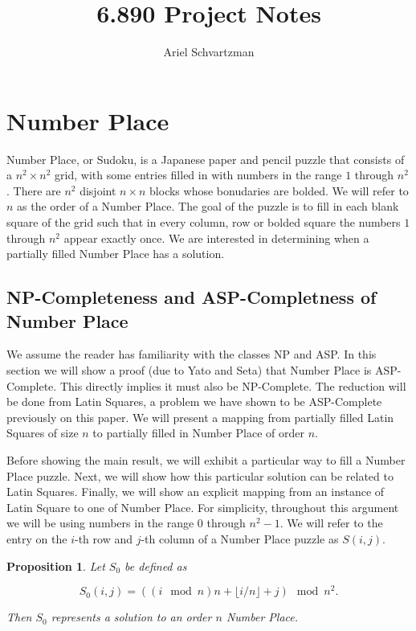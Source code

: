 \documentclass[11pt]{article}
\title{6.890 Project Notes}
\author{Ariel Schvartzman}
\newtheorem{proposition}[theorem]{Proposition}
\begin{document}
\maketitle

\section{Number Place} 

Number Place, or Sudoku, is a Japanese paper and pencil puzzle that consists of a $n^2 \times n^2$ grid, with some entries filled in with numbers in the range $1$ through $n^2$. There are $n^2$ disjoint $n \times n$ blocks whose bonudaries are bolded. We will refer to $n$ as the order of a Number Place. The goal of the puzzle is to fill in each blank square of the grid such that in every column, row or bolded square the numbers $1$ through $n^2$ appear exactly once. We are interested in determining when a partially filled Number Place has a solution. 
 
\subsection{NP-Completeness and ASP-Completness of Number Place}

We assume the reader has familiarity with the classes NP and ASP. In this section we will show a proof (due to Yato and Seta) that Number Place is ASP-Complete. This directly implies it must also be NP-Complete. The reduction will be done from Latin Squares, a problem we have shown to be ASP-Complete previously on this paper. We will present a mapping from partially filled Latin Squares of size $n$ to partially filled in Number Place of order $n$.  

Before showing the main result, we will exhibit a particular way to fill a Number Place puzzle. Next, we will show how this particular solution can be related to Latin Squares. Finally, we will show an explicit mapping from an instance of Latin Square to one of Number Place. For simplicity, throughout this argument we will be using numbers in the range $0$ through $n^2 - 1$. We will refer to the entry on the $i$-th row and $j$-th column of a Number Place puzzle as $S(i,j)$.

\begin{proposition}
Let $S_0$ be defined as

$$S_0 (i,j) = ((i \mod n) n + \lfloor i/n \rfloor + j) \mod n^2. $$

Then $S_0$ represents a solution to an order $n$ Number Place. 

\end{proposition} 
\end{document}
